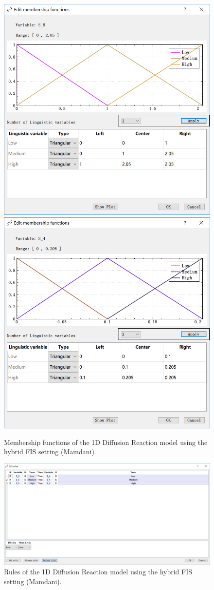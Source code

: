 \documentclass[journal,a4paper,onecolumn]{article}
\begin{document}
\begin{figure}[!hbt]
	\begin{center}
		\includegraphics[width=0.45\columnwidth]{fig36}
		\includegraphics[width=0.45\columnwidth]{fig37}
		\caption{Membership functions of the 1D Diffusion Reaction model using the hybrid FIS setting (Mamdani).}
		\label{fig:Membership functions of 1D Diffusion Reaction using hybrid FIS (Mamdani).}
	\end{center}
\end{figure}

\begin{figure}[!hbt]
	\begin{center}
		\includegraphics[width=\columnwidth]{fig38}
		\caption{Rules of the 1D Diffusion Reaction model using the hybrid FIS setting (Mamdani).}
		\label{fig:Rules of 1D Diffusion Reaction using hybrid FIS (Mamdani).}
	\end{center}
\end{figure}
\end{document}
